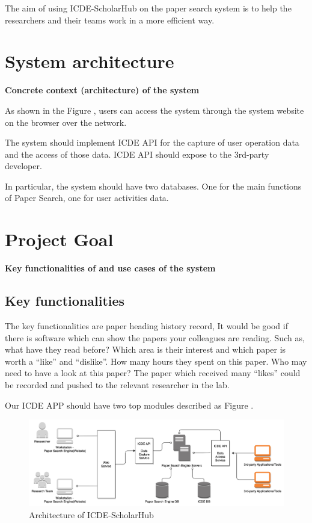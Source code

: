 \documentclass[sigconf, nonacm]{../tex_template/acmart}
\begin{document}
The aim of using ICDE-ScholarHub on the paper search system is to help the researchers and their teams work in a more efficient way.



\section{System architecture}
\textbf{Concrete context (architecture) of the system}

As shown in the Figure , users can access the system through the system website on the browser over the network.

The system should implement ICDE API for the capture of user operation data and the access of those data. ICDE API should expose to the 3rd-party developer.

In particular, the system should have two databases. One for the main functions of Paper Search, one for user activities data.

\section{Project Goal}
\textbf{Key functionalities of and use cases of the system}

\subsection{Key functionalities}

The key functionalities are paper heading history record,
It would be good if there is software which can show the papers your colleagues are reading. Such as, what have they read before? Which area is their interest and which paper is worth a “like'' and “dislike”. How many hours they spent on this paper. Who may need to have a look at this paper? The paper which received many “likes” could be recorded and pushed to the relevant researcher in the lab.

Our ICDE APP should have two top modules described as Figure .

\begin{figure}[htp]
	\centering
	\includegraphics[scale=0.1]{D1F1.png}
	\caption{Architecture of ICDE-ScholarHub}
	\label{fig:arch}
\end{figure}
\end{document}
